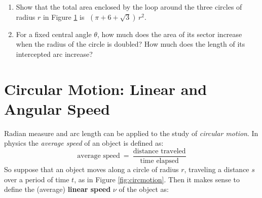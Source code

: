 {\begin{enumerate}[\bfseries 1.]
\begin{figure}[h]
\begin{minipage}[b]{7.5cm}
\begin{center}
\vspace{-5mm}
 \end{center}
 \caption[]{\quad Exercise \ref{exer:3circloop}}
 \label{fig:exer3circloop}
\end{minipage}
\end{figure}
 \item\label{exer:3circloop} Show that the total area enclosed by the loop around the three circles
  of radius $r$ in Figure \ref{fig:exer3circloop} is $\;(\pi + 6 + \sqrt{3})\,r^2$.
 \item For a fixed central angle $\theta$, how much does the area of its sector increase when the
  radius of the circle is doubled? How much does the length of its intercepted arc increase?
\end{enumerate}}
\newpage
\section{Circular Motion: Linear and Angular Speed}
\piccaption[]{\label{fig:circmotion}}
Radian measure and arc length can be applied to the study of \emph{circular
motion}. In physics the \emph{average speed} of an object
is defined as:
\begin{displaymath}
 \text{average speed} ~=~ \frac{\text{distance traveled}}{\text{time elapsed}}
\end{displaymath}
So suppose that an object moves along a circle of radius $r$, traveling
a distance $s$ over a period of time $t$, as in Figure \ref{fig:circmotion}. Then it makes sense to
define the (average) \textbf{linear speed} $\nu$ of the object as:

